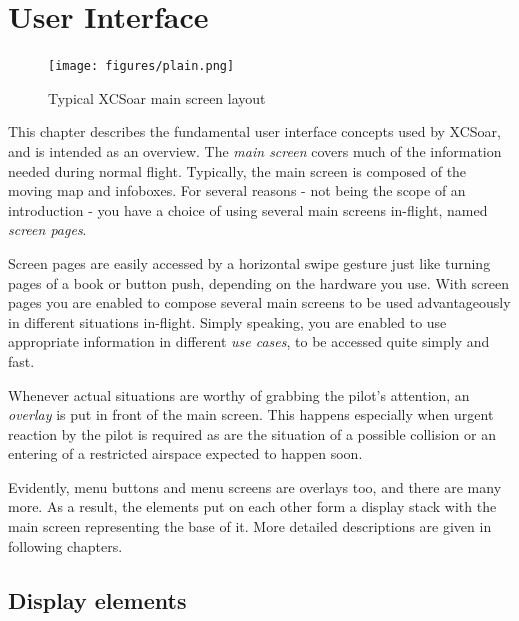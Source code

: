 \chapter{User Interface}\label{cha:interface}
\begin{figure}[h]
\texttt{[image: figures/plain.png]}
\caption{Typical XCSoar main screen layout}
\end{figure}

This chapter describes the fundamental user interface concepts used by 
XCSoar, and is intended as an overview. The \emph{main screen} covers much of 
the information needed during normal flight.  Typically, the main screen is 
composed of the moving map and infoboxes. For several reasons - not being the 
scope of an introduction - you have a choice of using several main screens 
in-flight, named \emph{screen pages}.

Screen pages are easily accessed by a horizontal swipe gesture just like 
turning pages of a book or button push, depending on the hardware you use. 
With screen pages you are enabled to compose several main screens to be used 
advantageously in different situations in-flight. Simply speaking, you are 
enabled to use appropriate information in different \emph{use cases}, to be 
accessed quite simply and fast. 

Whenever actual situations are worthy of grabbing the pilot's attention, an 
\emph{overlay} is put in front of the main screen. This happens especially 
when urgent reaction by the pilot is required as are the situation of a 
possible collision or an entering of a restricted airspace expected to happen
soon.

Evidently, menu buttons and menu screens are overlays too, and there are many 
more. As a result, the elements put on each other form a display stack with 
the main screen representing the base of it. More detailed descriptions are 
given in following chapters.



\section{Display elements}
